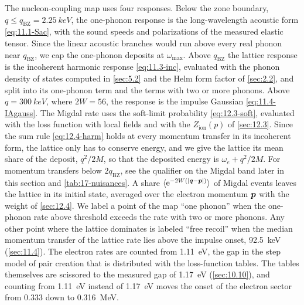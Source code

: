 The nucleon-coupling map uses four responses. Below the zone boundary, $q \le q_{\mathrm{BZ}} = \SI{2.25}{keV}$, the one-phonon response is the long-wavelength acoustic form \cref{eq:11.1-Sac}, with the sound speeds and polarizations of the measured elastic tensor. Since the linear acoustic branches would run above every real phonon near $q_{\mathrm{BZ}}$, we cap the one-phonon deposits at $\omega_{\mathrm{max}}$. Above $q_{\mathrm{BZ}}$ the lattice response is the incoherent harmonic response \cref{eq:11.3-inc}, evaluated with the phonon density of states computed in \cref{sec:5.2} and the Helm form factor of \cref{sec:2.2}, and split into its one-phonon term and the terms with two or more phonons. Above $q = \SI{300}{keV}$, where $2W = 56$, the response is the impulse Gaussian \cref{eq:11.4-IAgauss}. The Migdal rate uses the soft-limit probability \cref{eq:12.3-soft}, evaluated with the loss function with local fields and with the $Z_{\mathrm{ion}}(p)$ of \cref{sec:12.3}. Since the sum rule \cref{eq:12.4-harm} holds at every momentum transfer in its incoherent form, the lattice only has to conserve energy, and we give the lattice its mean share of the deposit, $q^2/2M$, so that the deposited energy is $\omega_e + q^2/2M$. For momentum transfers below $2q_{\mathrm{BZ}}$, see the qualifier on the Migdal band later in this section and \cref{tab:17-nuisances}. A share $\langle\mathrm{e}^{-2W(|\bm{q}-\bm{p}|)}\rangle$ of Migdal events leaves the lattice in its initial state, averaged over the electron momentum $\bm{p}$ with the weight of \cref{sec:12.4}. We label a point of the map ``one phonon'' when the one-phonon rate above threshold exceeds the rate with two or more phonons. Any other point where the lattice dominates is labeled ``free recoil'' when the median momentum transfer of the lattice rate lies above the impulse onset, \SI{92.5}{keV} (\cref{sec:11.4}). The electron rates are counted from \SI{1.11}{eV}, the gap in the step model of pair creation that is distributed with the loss-function tables. The tables themselves are scissored to the measured gap of \SI{1.17}{eV} (\cref{sec:10.10}), and counting from \SI{1.11}{eV} instead of \SI{1.17}{eV} moves the onset of the electron sector from 0.333 down to \SI{0.316}{MeV}.


